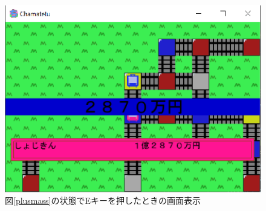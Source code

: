 \documentclass[a4j]{jarticle}
\begin{document}
    \begin{figure}[H]
        \centering
        \includegraphics[scale=1.3]{plusresult.eps}
        \caption{図\ref{plusmass}の状態でEキーを押したときの画面表示}
         \label{plusmassresult}
        \end{figure}
\end{document}
